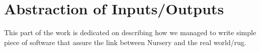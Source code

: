 \documentclass[12pt]{article}
\begin{document}

\appendix


\clearpage
\section{Abstraction of Inputs/Outputs}

This part of the work is dedicated on describing how we managed to write simple piece of software that assure the link between Nursery and the real world/\gls{rug}.
\end{document}

